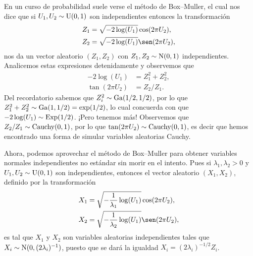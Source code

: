En un curso de probabilidad suele verse el método de Box--Muller, el cual nos dice que si $U_1, U_2 \sim \operatorname{U}(0,1)$ son independientes entonces la transformación 
\begin{align*}
    Z_1 & = \sqrt{-2\log(U_1)} \cos(2\pi U_2), \\
    Z_2 & = \sqrt{-2\log(U_1)} \sen(2\pi U_2),
\end{align*}
nos da un vector aleatorio $(Z_1, Z_2)$ con $Z_1, Z_2 \sim \operatorname{N}(0,1)$ independientes. Analicemos estas expresiones detenidamente y observemos que 
\begin{align*}
    -2\log(U_1) & = Z_1^2 + Z_2^2, \\
    \tan(2 \pi U_2) & = Z_2 /Z_1.
\end{align*}
Del recordatorio sabemos que $Z_i^2 \sim \operatorname{Ga}(1/2, 1/2)$, por lo que $Z_1^2+Z_2^2 \sim \operatorname{Ga}(1, 1/2) = \exp(1/2)$, lo cual concuerda con que $-2\log(U_1) \sim \operatorname{Exp}(1/2)$. ¡Pero tenemos más! Observemos que $Z_2/Z_1 \sim \operatorname{Cauchy}(0,1)$, por lo que $\tan(2\pi U_2) \sim \operatorname{Cauchy}(0,1)$, es decir que hemos encontrado una forma de simular variables aleatorias Cauchy. 

Ahora, podemos aprovechar el método de Box--Muller para obtener variables normales independientes no estándar sin morir en el intento. Pues si $\lambda_1, \lambda_2 > 0$ y $U_1, U_2 \sim \operatorname{U}(0,1)$ son independientes, entonces el vector aleatorio $(X_1, X_2)$, definido por la transformación
\begin{align*}
    X_1 & = \sqrt{-\frac 1 {\lambda_1} \log (U_1)} \cos(2\pi U_2), \\
    X_2 & = \sqrt{-\frac 1 {\lambda_2} \log (U_1)} \sen(2\pi U_2),
\end{align*}
es tal que $X_1$ y $X_2$ son variables aleatorias independientes tales que $X_i \sim \operatorname{N}(0, (2\lambda_i)^{-1})$, puesto que se dará la igualdad $X_i = (2\lambda_i)^{-1/2} Z_i$.


